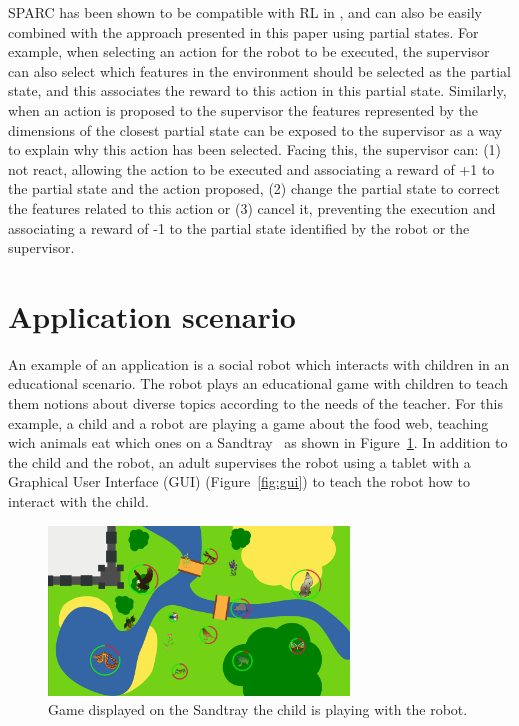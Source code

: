 \documentclass[letterpaper]{article} %
\begin{document}
SPARC has been shown to be compatible with RL in \cite{senft2017supervised},
and can also be easily combined with the approach presented in this paper using
partial states. For example, when selecting an action for the robot to be
executed, the supervisor can also select which features in the environment
should be selected as the partial state, and this associates the reward 
to this action in this partial state. Similarly, when an action is
proposed to the supervisor the features represented by the dimensions of the
closest partial state can be exposed to the supervisor as a way to explain why
this action has been selected. Facing this, the supervisor can: (1) not react,
allowing the action to be executed and associating a reward of +1 to the partial
state and the action proposed, (2) change the partial state to correct the features
related to this action or (3) cancel it, preventing the execution and associating a
reward of -1 to the partial state identified by the robot or the supervisor. 

\section{Application scenario}

An example of an application is a social robot which interacts with children in an educational scenario.
The robot plays an educational game with children to teach them notions about
diverse topics according to the needs of the teacher. For this example, a child
and a robot are playing a game about the food web, teaching wich animals eat which
ones on a Sandtray~\cite{baxter2012touchscreen} as shown in
Figure~\ref{fig:game}. In addition to the child and
the robot, an adult supervises the robot using a tablet with a Graphical User
Interface (GUI) (Figure~\ref{fig:gui}) to teach the robot how to interact with the child.
\begin{figure}
        \centering
  \includegraphics[width=80mm]{./fig/game.png} 
    \caption{Game displayed on the Sandtray the child is playing with the robot.}
        \label{fig:game}
\end{figure}
\end{document}
